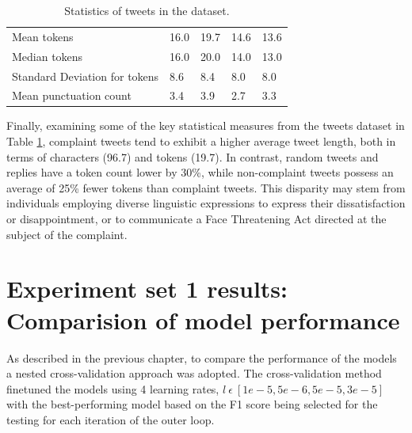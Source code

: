 \begin{table}[htbp]
\begin{tabularx}{\textwidth}{|l|X|X|X|X|}
        Mean tokens                     & 16.0                & 19.7                & 14.6                    & 13.6            \\
        \rowcolor[gray]{0.9}
        Median tokens                   & 16.0                & 20.0                & 14.0                    & 13.0            \\
        Standard Deviation for tokens   & 8.6                 & 8.4                 & 8.0                     & 8.0             \\
        \hline
        \hline
        Mean punctuation count          & 3.4                 & 3.9                 & 2.7                     & 3.3             \\
        \hline
    \end{tabularx}
    \caption{Statistics of tweets in the dataset.}
    \label{tab: tweets_statistics}
\end{table}

Finally, examining some of the key statistical measures from the tweets dataset in Table \ref{tab: tweets_statistics}, complaint tweets tend to exhibit a higher average tweet length, both in terms of characters (96.7) and tokens (19.7). In contrast, random tweets and replies have a token count lower by 30\%, while non-complaint tweets possess an average of 25\% fewer tokens than complaint tweets. This disparity may stem from individuals employing diverse linguistic expressions to express their dissatisfaction or disappointment, or to communicate a Face Threatening Act directed at the subject of the complaint.

\section{Experiment set 1 results: Comparision of model performance}
As described in the previous chapter, to compare the performance of the models a nested cross-validation approach was adopted. The cross-validation method finetuned the models using 4 learning rates, $l\:\epsilon\:[1e-5, 5e-6, 5e-5, 3e-5]$ with the best-performing model based on the F1 score being selected for the testing for each iteration of the outer loop. \\

